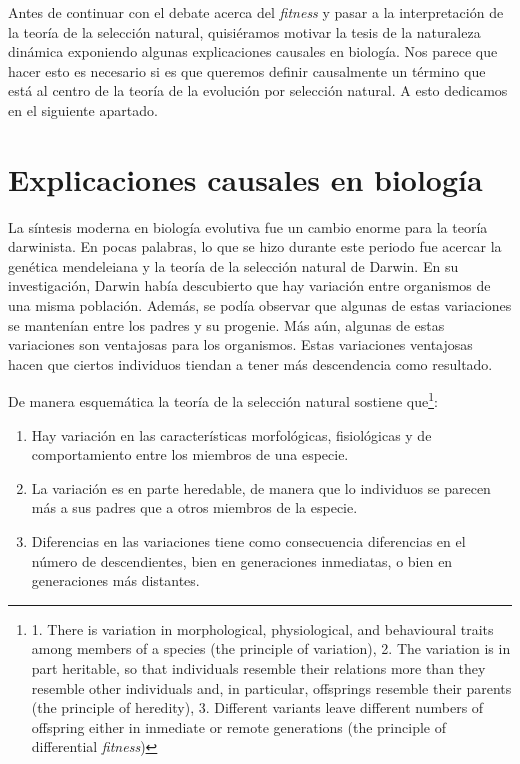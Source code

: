 Antes de continuar con el debate acerca del \emph{fitness} y pasar a la interpretación de la teoría de la selección natural, quisiéramos motivar la tesis de la naturaleza dinámica exponiendo algunas explicaciones causales en biología. Nos parece que hacer esto es necesario si es que queremos definir causalmente un término que está al centro de la teoría de la evolución por selección natural. A esto dedicamos en el siguiente apartado.

\section{Explicaciones causales en biología}

\noindent La síntesis moderna en biología evolutiva fue un cambio enorme para la teoría darwinista. En pocas palabras, lo que se hizo durante este periodo fue acercar la genética mendeleiana y la teoría de la selección natural de Darwin. En su investigación, Darwin había descubierto que hay variación entre organismos de una misma población. Además, se podía observar que algunas de estas variaciones se mantenían entre los padres y su progenie. Más aún, algunas de estas variaciones son ventajosas para los organismos. Estas variaciones ventajosas hacen que ciertos individuos tiendan a tener más descendencia como resultado.

De manera esquemática la teoría de la selección natural sostiene que\footnote{1. There is variation in morphological, physiological, and behavioural traits among members of a species (the principle of variation), 2. The variation is in part heritable, so that individuals resemble their relations more than they resemble other individuals and, in particular, offsprings resemble their parents (the principle of heredity), 3. Different variants leave different numbers of offspring either in inmediate or remote generations (the principle of differential \emph{fitness})}:

\begin{enumerate}
  \item Hay variación en las características morfológicas, fisiológicas y de comportamiento entre los miembros de una especie.
  \item La variación es en parte heredable, de manera que lo individuos se parecen más a sus padres que a otros miembros de la especie.
  \item Diferencias en las variaciones tiene como consecuencia diferencias en el número de descendientes, bien en generaciones inmediatas, o bien en generaciones más distantes\cite{Godfrey-Smith2013}.
\end{enumerate}


